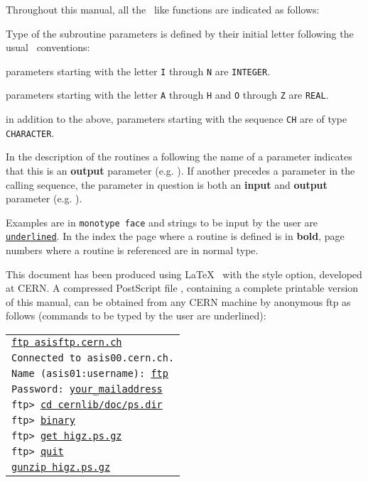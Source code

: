 Throughout this manual, all the \GKS~like functions are indicated as follows:

 
Type of the subroutine parameters is defined by their
initial letter following the usual \FORTRAN~conventions:

\begin{ULc}
\item parameters starting with the letter {\tt I} through {\tt N} are 
      {\tt INTEGER}.
\item parameters starting with the letter {\tt A} through {\tt H} and {\tt O}
      through {\tt Z} are {\tt REAL}.
\item in addition to the above, parameters starting with the
      sequence {\tt CH} are of type {\tt CHARACTER}.
\end{ULc}

In the description of the routines a \Lit{*} following
the name of a parameter indicates that this is an {\bf output} parameter
(e.g. ).
If another \Lit{*} precedes a parameter in the calling sequence, the
parameter in question is both an {\bf input} and {\bf output} parameter
(e.g. ).

Examples are in {\tt monotype face} and strings to be input by the user 
are {\tt\underline{underlined}}.
In the index the page where a routine is defined is in {\bf bold},
page numbers where a routine is referenced are in normal type.

This document has been produced using \LaTeX~\cite{bib-LATEX}
with the  style option, developed at CERN. 
A compressed PostScript file , containing a complete printable version
of this manual, can be obtained from any CERN machine
by anonymous ftp as follows
(commands to be typed by the user are underlined):

\vspace*{3mm} 
\begin{tabular}{@{\hspace{12mm}}>{\tt}l}
\underline{ftp asisftp.cern.ch}\\
Connected to asis00.cern.ch.\\
Name (asis01:username): \underline{ftp}\\
Password: \underline{your\_{}mailaddress}\\
ftp> \underline{cd cernlib/doc/ps.dir}\\
ftp> \underline{binary}\\
ftp> \underline{get higz.ps.gz}\\
ftp> \underline{quit}\\
\underline{gunzip higz.ps.gz}
\end{tabular}
 
\newpage
\tableofcontents
\newpage
\listoffigures
\listoftables
 
